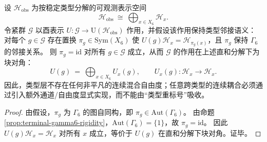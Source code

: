 \begin{corollary}[类型层的超选择分解：\texorpdfstring{$\mathrm{Aut}(\Gamma_6)=\{1\}$}{Aut(Gamma6)=1} 强迫连续对称仅能作用于纤维内部]\label{cor:window6-type-superselection-autgamma6}
设 \(\mathcal{H}_{\mathrm{obs}}\) 为按稳定类型分解的可观测表示空间
\[
\mathcal{H}_{\mathrm{obs}}\ \cong\ \bigoplus_{x\in X_6}\mathcal{H}_x.
\]
令紧群 \(\mathcal{G}\) 以酉表示 \(U:\mathcal{G}\to \mathrm{U}(\mathcal{H}_{\mathrm{obs}})\) 作用，并假设该作用保持类型邻接语义：对每个 \(g\in\mathcal{G}\) 存在置换 \(\pi_g\in\mathrm{Sym}(X_6)\) 使
\(
U(g)\mathcal{H}_x=\mathcal{H}_{\pi_g(x)}
\)，且 \(\pi_g\) 保持 \(\Gamma_6\) 的邻接关系。
则 \(\pi_g=\mathrm{id}\) 对所有 \(g\in\mathcal{G}\) 成立，从而 \(\mathcal{G}\) 的作用在上述直和分解下为块对角：
\[
U(g)\ =\ \bigoplus_{x\in X_6}U_x(g),
\qquad
U_x(g):\mathcal{H}_x\to\mathcal{H}_x.
\]
因此，类型层不存在任何非平凡的连续混合自由度；任意跨类型的连续耦合必须通过引入额外通道/自由度显式实现，而不能由“类型重标号”吸收。
\end{corollary}
\begin{proof}
由假设，\(\pi_g\) 为 \(\Gamma_6\) 的图自同构，即 \(\pi_g\in \mathrm{Aut}(\Gamma_6)\)。
由命题 \ref{prop:terminal-gamma6-rigidity}，\(\mathrm{Aut}(\Gamma_6)=\{1\}\)，故 \(\pi_g=\mathrm{id}\)。
因此 \(U(g)\mathcal{H}_x=\mathcal{H}_x\) 对所有 \(x\) 成立，等价于 \(U(g)\) 在直和分解下块对角。证毕。
\end{proof}
